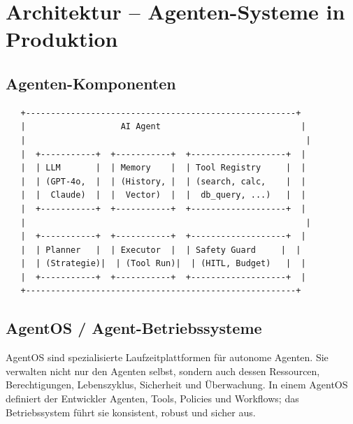 
\section{Architektur -- Agenten-Systeme in Produktion}

\subsection{Agenten-Komponenten}

\begin{verbatim}
   +------------------------------------------------------+
   |                   AI Agent                            |
   |                                                        |
   |  +-----------+  +-----------+  +-------------------+  |
   |  | LLM       |  | Memory    |  | Tool Registry     |  |
   |  | (GPT-4o,  |  | (History, |  | (search, calc,    |  |
   |  |  Claude)  |  |  Vector)  |  |  db_query, ...)   |  |
   |  +-----------+  +-----------+  +-------------------+  |
   |                                                        |
   |  +-----------+  +-----------+  +-------------------+  |
   |  | Planner   |  | Executor  |  | Safety Guard     |  |
   |  | (Strategie)|  | (Tool Run)|  | (HITL, Budget)   |  |
   |  +-----------+  +-----------+  +-------------------+  |
   +------------------------------------------------------+
\end{verbatim}

\subsection{AgentOS / Agent-Betriebssysteme}

AgentOS sind spezialisierte Laufzeitplattformen für autonome Agenten. Sie verwalten nicht nur den Agenten selbst, sondern auch dessen Ressourcen, Berechtigungen, Lebenszyklus, Sicherheit und Überwachung. In einem AgentOS definiert der Entwickler Agenten, Tools, Policies und Workflows; das Betriebssystem führt sie konsistent, robust und sicher aus.

